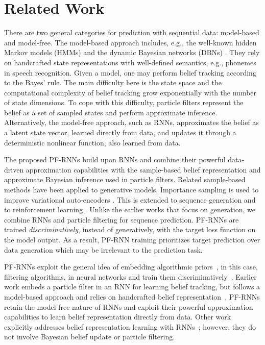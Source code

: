 \documentclass[letterpaper]{article} %
\begin{document}
\section{Related Work}
There are two general categories for prediction with sequential data: model-based and model-free.
The model-based approach includes, e.g.,  the well-known hidden Markov models (HMMs) and the dynamic Bayesian networks (DBNs) \cite{murphy2002dynamic}.   
They rely on handcrafted state representations with well-defined semantics, e.g., phonemes in speech recognition.
Given a model, one may perform belief tracking according to the Bayes' rule. The main difficulty here is the state space and  the computational complexity of belief tracking grow exponentially with the number of state dimensions. 
To cope with this difficulty, particle filters represent the belief as a set of sampled states and perform approximate inference.
Alternatively, the model-free approach, such as RNNs, approximates the belief as a latent state vector,  learned directly from data, and updates it through a deterministic nonlinear function, also learned from data.

The proposed PF-RNNs build upon RNNs and combine their powerful data-driven approximation capabilities with the sample-based belief representation and approximate Bayesian inference used in particle filters. 
Related sample-based methods have been applied to generative models.
Importance sampling is used to improve variational auto-encoders \cite{burda2015importance}. This is extended to sequence generation \cite{le2017auto}
and to  reinforcement learning  \cite{igl2018deep}. 
Unlike the earlier works that focus on generation, we combine  RNNs and particle filtering for sequence prediction.
PF-RNNs are trained \textit{discriminatively}, instead of generatively, with the target loss function on the model output. 
As a result,  PF-RNN training prioritizes target prediction over data generation which may be irrelevant to the prediction task. 

PF-RNNs exploit the general idea of embedding algorithmic priors~\cite{karkus2019differentiable}, in this case, filtering algorithms, in neural networks and train them discriminatively~\cite{jonschkowski2016end,karkus2018particle}. 
Earlier work embeds a particle filter in an RNN for learning belief tracking, but follows a model-based approach and relies on handcrafted belief representation~\cite{jonschkowski2018differentiable,karkus2018particle}.
PF-RNNs retain the model-free nature of RNNs and exploit their powerful approximation capabilities to learn belief representation directly from data. Other work explicitly addresses belief representation learning with RNNs~\cite{gregor2018temporal,guo2018neural}; however, they do not involve Bayesian belief update or particle filtering. 
\end{document}
